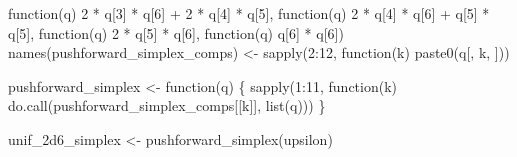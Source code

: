 \documentclass[
  letterpaper,
  DIV=11,
  numbers=noendperiod]{scrartcl}
\newenvironment{Shaded}{\begin{snugshade}}{\end{snugshade}}
\newcommand{\ControlFlowTok}[1]{\textcolor[rgb]{0.00,0.23,0.31}{#1}}
\newcommand{\DecValTok}[1]{\textcolor[rgb]{0.68,0.00,0.00}{#1}}
\newcommand{\FunctionTok}[1]{\textcolor[rgb]{0.28,0.35,0.67}{#1}}
\newcommand{\NormalTok}[1]{\textcolor[rgb]{0.00,0.23,0.31}{#1}}
\newcommand{\OtherTok}[1]{\textcolor[rgb]{0.00,0.23,0.31}{#1}}
\newcommand{\SpecialCharTok}[1]{\textcolor[rgb]{0.37,0.37,0.37}{#1}}
\newcommand{\StringTok}[1]{\textcolor[rgb]{0.13,0.47,0.30}{#1}}
\begin{document}
\begin{Shaded}
\begin{Highlighting}[]
       \ControlFlowTok{function}\NormalTok{(q)}
         \DecValTok{2} \SpecialCharTok{*}\NormalTok{ q[}\DecValTok{3}\NormalTok{] }\SpecialCharTok{*}\NormalTok{ q[}\DecValTok{6}\NormalTok{] }\SpecialCharTok{+} \DecValTok{2} \SpecialCharTok{*}\NormalTok{ q[}\DecValTok{4}\NormalTok{] }\SpecialCharTok{*}\NormalTok{ q[}\DecValTok{5}\NormalTok{],}
       \ControlFlowTok{function}\NormalTok{(q)}
         \DecValTok{2} \SpecialCharTok{*}\NormalTok{ q[}\DecValTok{4}\NormalTok{] }\SpecialCharTok{*}\NormalTok{ q[}\DecValTok{6}\NormalTok{] }\SpecialCharTok{+}\NormalTok{     q[}\DecValTok{5}\NormalTok{] }\SpecialCharTok{*}\NormalTok{ q[}\DecValTok{5}\NormalTok{],}
       \ControlFlowTok{function}\NormalTok{(q)}
         \DecValTok{2} \SpecialCharTok{*}\NormalTok{ q[}\DecValTok{5}\NormalTok{] }\SpecialCharTok{*}\NormalTok{ q[}\DecValTok{6}\NormalTok{],}
       \ControlFlowTok{function}\NormalTok{(q)}
\NormalTok{             q[}\DecValTok{6}\NormalTok{] }\SpecialCharTok{*}\NormalTok{ q[}\DecValTok{6}\NormalTok{])}
\FunctionTok{names}\NormalTok{(pushforward\_simplex\_comps) }\OtherTok{\textless{}{-}} \FunctionTok{sapply}\NormalTok{(}\DecValTok{2}\SpecialCharTok{:}\DecValTok{12}\NormalTok{,}
                                           \ControlFlowTok{function}\NormalTok{(k) }\FunctionTok{paste0}\NormalTok{(}\StringTok{\textquotesingle{}q[\textquotesingle{}}\NormalTok{, k, }\StringTok{\textquotesingle{}]\textquotesingle{}}\NormalTok{))}

\NormalTok{pushforward\_simplex }\OtherTok{\textless{}{-}} \ControlFlowTok{function}\NormalTok{(q) \{}
  \FunctionTok{sapply}\NormalTok{(}\DecValTok{1}\SpecialCharTok{:}\DecValTok{11}\NormalTok{,}
         \ControlFlowTok{function}\NormalTok{(k) }\FunctionTok{do.call}\NormalTok{(pushforward\_simplex\_comps[[k]], }\FunctionTok{list}\NormalTok{(q)))}
\NormalTok{\}}
\end{Highlighting}
\end{Shaded}

\begin{Shaded}
\begin{Highlighting}[]
\NormalTok{unif\_2d6\_simplex }\OtherTok{\textless{}{-}} \FunctionTok{pushforward\_simplex}\NormalTok{(upsilon)}
\end{Highlighting}
\end{Shaded}

\begin{Shaded}
\end{Shaded}
\end{document}

